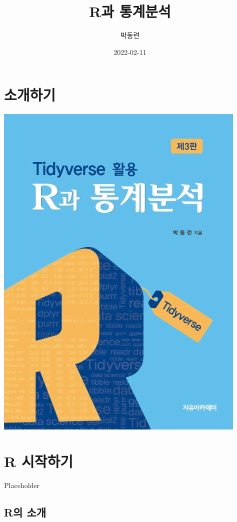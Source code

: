 \documentclass[
]{book}
\title{R과 통계분석}
\author{박동련}
\date{2022-02-11}
\begin{document}
\maketitle

{
\setcounter{tocdepth}{1}
\tableofcontents
}
\hypertarget{uxc18cuxac1cuxd558uxae30}{%
\chapter*{소개하기}\label{uxc18cuxac1cuxd558uxae30}}

\includegraphics{Figure/cover.jpg}

\hypertarget{r-uxc2dcuxc791uxd558uxae30}{%
\chapter{R 시작하기}\label{r-uxc2dcuxc791uxd558uxae30}}

Placeholder

\hypertarget{ruxc758-uxc18cuxac1c}{%
\section{R의 소개}\label{ruxc758-uxc18cuxac1c}}
\end{document}
